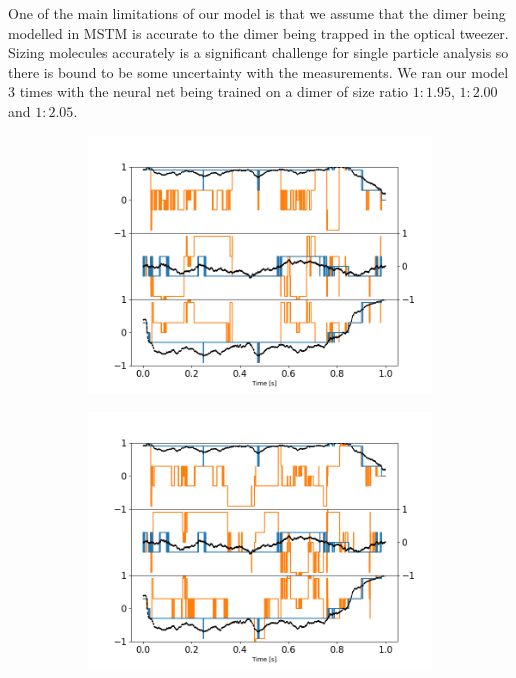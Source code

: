 One of the main limitations of our model is that we assume that the dimer being modelled in MSTM is accurate to the dimer being trapped in the optical tweezer. Sizing molecules accurately is a significant challenge for single particle analysis so there is bound to be some uncertainty with the measurements. We ran our model 3 times with the neural net being trained on a dimer of size ratio $1:1.95$, $1:2.00$ and $1:2.05$.
\begin{figure}[h!]
	\centering
	\begin{subfigure}{0.33\textwidth}
		\subcaption{}
		\includegraphics[width =\textwidth]{fig8a.png}
	\end{subfigure}
	\begin{subfigure}{0.31\textwidth}
		\subcaption{}
		\includegraphics[width=\textwidth]{fig8b.png}

\end{subfigure}
\end{figure}
